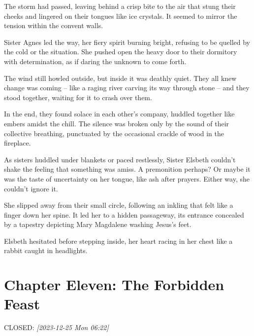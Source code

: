 \documentclass[11pt]{article}
\begin{document}
The storm had passed, leaving behind a crisp bite to the air that stung their cheeks and lingered on their tongues like ice crystals. It seemed to mirror the tension within the convent walls.

Sister Agnes led the way, her fiery spirit burning bright, refusing to be quelled by the cold or the situation. She pushed open the heavy door to their dormitory with determination, as if daring the unknown to come forth.

The wind still howled outside, but inside it was deathly quiet. They all knew change was coming – like a raging river carving its way through stone – and they stood together, waiting for it to crash over them.

In the end, they found solace in each other's company, huddled together like embers amidst the chill. The silence was broken only by the sound of their collective breathing, punctuated by the occasional crackle of wood in the fireplace.

As sisters huddled under blankets or paced restlessly, Sister Elsbeth couldn't shake the feeling that something was amiss. A premonition perhaps? Or maybe it was the taste of uncertainty on her tongue, like ash after prayers. Either way, she couldn't ignore it.

She slipped away from their small circle, following an inkling that felt like a finger down her spine. It led her  to a hidden passageway, its entrance concealed by a tapestry depicting Mary Magdalene washing Jesus's feet.

Elsbeth hesitated before stepping inside, her heart racing in her chest like a rabbit caught in headlights.

\section{Chapter Eleven: The Forbidden Feast}
\label{sec:orgaee7a5f}
CLOSED: \textit{[2023-12-25 Mon 06:22]}
\end{document}
